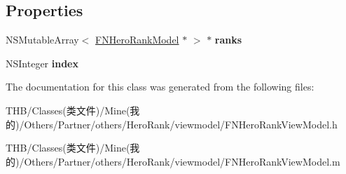 \subsection*{Properties}
\begin{DoxyCompactItemize}
\item 
\mbox{\label{interface_f_n_hero_rank_view_model_a3306d297e55d23e5f3e19d04aa5c1b1b}} 
N\+S\+Mutable\+Array$<$ \mbox{\hyperlink{interface_f_n_hero_rank_model}{F\+N\+Hero\+Rank\+Model}} $\ast$ $>$ $\ast$ {\bfseries ranks}
\item 
\mbox{\label{interface_f_n_hero_rank_view_model_add3bff93a223bce9f583a6271cf2881b}} 
N\+S\+Integer {\bfseries index}
\end{DoxyCompactItemize}


The documentation for this class was generated from the following files\+:\begin{DoxyCompactItemize}
\item 
T\+H\+B/\+Classes(类文件)/\+Mine(我的)/\+Others/\+Partner/others/\+Hero\+Rank/viewmodel/F\+N\+Hero\+Rank\+View\+Model.\+h\item 
T\+H\+B/\+Classes(类文件)/\+Mine(我的)/\+Others/\+Partner/others/\+Hero\+Rank/viewmodel/F\+N\+Hero\+Rank\+View\+Model.\+m\end{DoxyCompactItemize}
